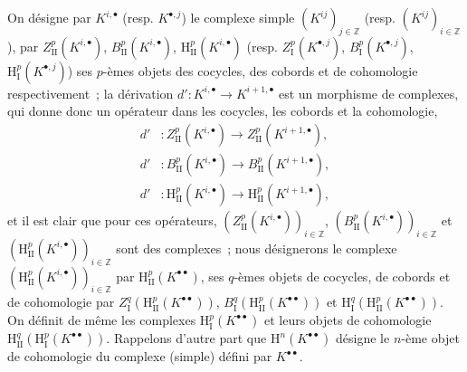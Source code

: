 \begin{env}[11.3.1]
On désigne par $K^{i,\bullet}$ (resp. $K^{\bullet,j}$) le complexe simple
$(K^{ij})_{j\in\mathbb Z}$ (resp. $(K^{ij})_{i\in\mathbb Z}$), par
$Z_{\mathrm{II}}^p(K^{i,\bullet})$, $B_{\mathrm{II}}^p(K^{i,\bullet})$,
$\mathrm H_{\mathrm{II}}^p(K^{i,\bullet})$ (resp.
$Z_{\mathrm I}^p(K^{\bullet,j})$, $B_{\mathrm I}^p(K^{\bullet,j})$,
$\mathrm H_{\mathrm I}^p(K^{\bullet,j})$) ses $p$-èmes objets des cocycles,
des cobords et de cohomologie respectivement~; la dérivation
$d':K^{i,\bullet}\to K^{i+1,\bullet}$ est un morphisme de complexes, qui
donne donc un opérateur dans les cocycles, les cobords et la cohomologie,
\[
\begin{aligned}
  d'&:Z_{\mathrm{II}}^p(K^{i,\bullet})
      \longrightarrow Z_{\mathrm{II}}^p(K^{i+1,\bullet}),\\
  d'&:B_{\mathrm{II}}^p(K^{i,\bullet})
      \longrightarrow B_{\mathrm{II}}^p(K^{i+1,\bullet}),\\
  d'&:\mathrm H_{\mathrm{II}}^p(K^{i,\bullet})
      \longrightarrow \mathrm H_{\mathrm{II}}^p(K^{i+1,\bullet}),
\end{aligned}
\]
et il est clair que pour ces opérateurs,
$(Z_{\mathrm{II}}^p(K^{i,\bullet}))_{i\in\mathbb Z}$,
$(B_{\mathrm{II}}^p(K^{i,\bullet}))_{i\in\mathbb Z}$ et
$(\mathrm H_{\mathrm{II}}^p(K^{i,\bullet}))_{i\in\mathbb Z}$ sont des
complexes~; nous désignerons le complexe
$(\mathrm H_{\mathrm{II}}^p(K^{i,\bullet}))_{i\in\mathbb Z}$ par
$\mathrm H_{\mathrm{II}}^p(K^{\bullet\bullet})$, ses $q$-èmes objets de
cocycles, de cobords et de cohomologie par
$Z_{\mathrm I}^q(\mathrm H_{\mathrm{II}}^p(K^{\bullet\bullet}))$,
$B_{\mathrm I}^q(\mathrm H_{\mathrm{II}}^p(K^{\bullet\bullet}))$ et
$\mathrm H_{\mathrm I}^q(\mathrm H_{\mathrm{II}}^p(K^{\bullet\bullet}))$.
On définit de même les complexes
$\mathrm H_{\mathrm I}^p(K^{\bullet\bullet})$ et leurs objets de cohomologie
$\mathrm H_{\mathrm{II}}^q(\mathrm H_{\mathrm I}^p(K^{\bullet\bullet}))$.
Rappelons d'autre part que $\mathrm H^n(K^{\bullet\bullet})$ désigne le
$n$-ème objet de cohomologie du complexe (simple) défini par
$K^{\bullet\bullet}$.
\end{env}

